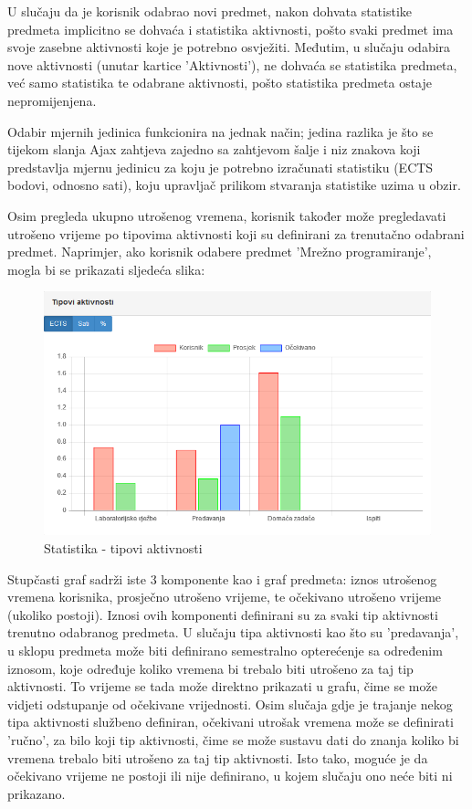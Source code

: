 \documentclass[times, utf8, zavrsni]{fer}
\begin{document}
U slučaju da je korisnik odabrao novi predmet, nakon dohvata statistike predmeta implicitno se dohvaća i statistika aktivnosti, pošto svaki predmet ima svoje zasebne aktivnosti koje je potrebno osvježiti. Međutim, u slučaju odabira nove aktivnosti (unutar kartice 'Aktivnosti'), ne dohvaća se statistika predmeta, već samo statistika te odabrane aktivnosti, pošto statistika predmeta ostaje nepromijenjena.

Odabir mjernih jedinica funkcionira na jednak način; jedina razlika je što se tijekom slanja Ajax zahtjeva zajedno sa zahtjevom šalje i niz znakova koji predstavlja mjernu jedinicu za koju je potrebno izračunati statistiku (ECTS bodovi, odnosno sati), koju upravljač prilikom stvaranja statistike uzima u obzir.

\lstset{style=js}


Osim pregleda ukupno utrošenog vremena, korisnik također može pregledavati utrošeno vrijeme po tipovima aktivnosti koji su definirani za trenutačno odabrani predmet. Naprimjer, ako korisnik odabere predmet 'Mrežno programiranje', mogla bi se prikazati sljedeća slika:

\begin{figure}[H]
\centering
\includegraphics[scale=0.7]{img/statistika-tip-aktivnosti.png}
\caption{Statistika - tipovi aktivnosti}
\label{fig:statistika-tip-aktivnosti}
\end{figure}

Stupčasti graf sadrži iste 3 komponente kao i graf predmeta: iznos utrošenog vremena korisnika, prosječno utrošeno vrijeme, te očekivano utrošeno vrijeme (ukoliko postoji). Iznosi ovih komponenti definirani su za svaki tip aktivnosti trenutno odabranog predmeta. U slučaju tipa aktivnosti kao što su 'predavanja', u sklopu predmeta može biti definirano semestralno opterećenje sa određenim iznosom, koje određuje koliko vremena bi trebalo biti utrošeno za taj tip aktivnosti. To vrijeme se tada može direktno prikazati u grafu, čime se može vidjeti odstupanje od očekivane vrijednosti. Osim slučaja gdje je trajanje nekog tipa aktivnosti službeno definiran, očekivani utrošak vremena može se definirati 'ručno', za bilo koji tip aktivnosti, čime se može sustavu dati do znanja koliko bi vremena trebalo biti utrošeno za taj tip aktivnosti. Isto tako, moguće je da očekivano vrijeme ne postoji ili nije definirano, u kojem slučaju ono neće biti ni prikazano.
\end{document}
